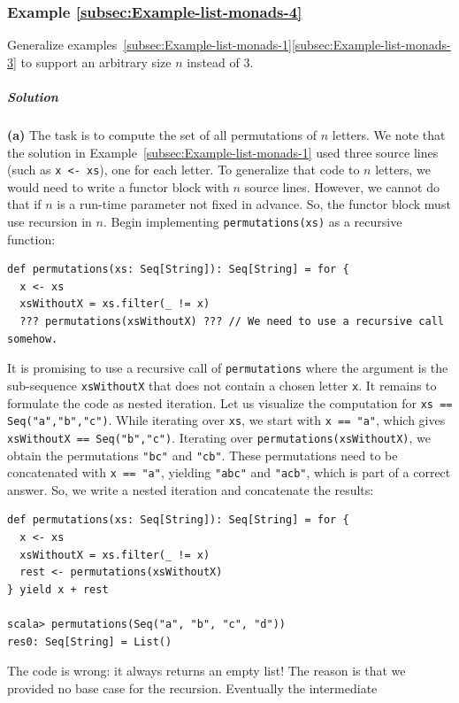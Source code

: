 \subsubsection{Example \label{subsec:Example-list-monads-4}\ref{subsec:Example-list-monads-4}}

Generalize examples~\ref{subsec:Example-list-monads-1}\textendash \ref{subsec:Example-list-monads-3}
to support an arbitrary size $n$ instead of $3$.

\subparagraph{Solution}

\textbf{(a)} The task is to compute the set of all permutations of
$n$ letters. We note that the solution in Example~\ref{subsec:Example-list-monads-1}
used three source lines (such as \lstinline!x <- xs!), one for each
letter. To generalize that code to $n$ letters, we would need to
write a functor block with $n$ source lines. However, we cannot do
that if $n$ is a run-time parameter not fixed in advance. So, the
functor block must use recursion in $n$. Begin implementing \lstinline!permutations(xs)!
as a recursive function:
\begin{lstlisting}
def permutations(xs: Seq[String]): Seq[String] = for {
  x <- xs
  xsWithoutX = xs.filter(_ != x)
  ??? permutations(xsWithoutX) ??? // We need to use a recursive call somehow.
\end{lstlisting}
It is promising to use a recursive call of \lstinline!permutations!
where the argument is the sub-sequence \lstinline!xsWithoutX! that
does not contain a chosen letter \lstinline!x!. It remains to formulate
the code as nested iteration. Let us visualize the computation for
\lstinline!xs == Seq("a","b","c")!. While iterating over \lstinline!xs!,
we start with \lstinline!x == "a"!, which gives \lstinline!xsWithoutX == Seq("b","c")!.
Iterating over \lstinline!permutations(xsWithoutX)!, we obtain the
permutations \lstinline!"bc"! and \lstinline!"cb"!. These permutations
need to be concatenated with \lstinline!x == "a"!, yielding \lstinline!"abc"!
and \lstinline!"acb"!, which is part of a correct answer. So, we
write a nested iteration and concatenate the results:
\begin{lstlisting}
def permutations(xs: Seq[String]): Seq[String] = for {
  x <- xs
  xsWithoutX = xs.filter(_ != x)
  rest <- permutations(xsWithoutX)
} yield x + rest

scala> permutations(Seq("a", "b", "c", "d"))
res0: Seq[String] = List()
\end{lstlisting}
The code is wrong: it always returns an empty list! The reason is
that we provided no base case for the recursion. Eventually the intermediate
